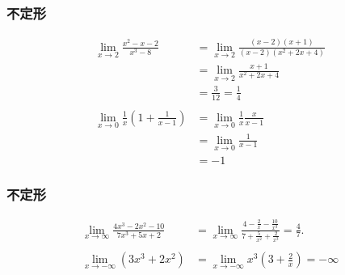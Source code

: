 

\begin{frame}
\frametitle{不定形} 


\begin{align*}
\lim_{x\to 2} \frac{x^2-x-2}{x^3-8}
& =  \lim_{x\to 2} \frac{(x-2)(x+1)}{(x-2)(x^2+2x+4)} \\
& =   \lim_{x\to 2}\frac{x+1}{x^2+2x+4} \\
& = \frac{3}{12}=\frac{1}{4} \\
\ & \ \\
\lim_{x\to 0} \frac{1}{x}(1+\frac{1}{x-1})
& =  \lim_{x\to 0} \frac{1}{x} \frac{x}{x-1} \\
& =  \lim_{x\to 0}\frac{1}{x-1} \\
& = -1
\end{align*}




\end{frame}




\begin{frame}
\frametitle{不定形} 


\begin{align*}
\lim_{x \to \infty}\frac{4x^3-2x^2-10}{7x^3+5x+2} 
& = \lim_{x \to \infty} \frac{4-\frac{2}{x}-\frac{10}{x^3}}{7+\frac{5}{x^2}+\frac{2}{x^3}} = \frac{4}{7}. \\
\ & \ \\
\lim_{x\to -\infty} (3x^3+2x^2)
& =  \lim_{x\to -\infty} x^3(3+\frac{2}{x})  = -\infty
\end{align*}


\end{frame}




